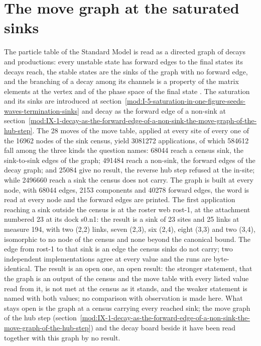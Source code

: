 \section{The move graph at the saturated sinks}\label{mod:I-5-D539442-w-gskm}
The particle table of the Standard Model is read as a directed graph of decays and productions: every unstable state has forward edges to the final states its decays reach, the stable states are the sinks of the graph with no forward edge, and the branching of a decay among its channels is a property of the matrix elements at the vertex and of the phase space of the final state \cite{Griffiths2008,Weinberg1995}. The saturation and its sinks are introduced at section~\ref{mod:I-5-saturation-in-one-figure-seeds-waves-termination-sinks} and decay as the forward edge of a non-sink at section~\ref{mod:IX-1-decay-as-the-forward-edge-of-a-non-sink-the-move-graph-of-the-hub-step}.
The 28 moves of the move table, applied at every site of every one of the 16962 nodes of the sink census, yield 3081272 applications, of which 584612 fall among the three kinds the question names: 68044 reach a census sink, the sink-to-sink edges of the graph; 491484 reach a non-sink, the forward edges of the decay graph; and 25084 give no result, the reverse hub step refused at the in-site; while 2496660 reach a sink the census does not carry.
The graph is built at every node, with 68044 edges, 2153 components and 40278 forward edges, the word is read at every node and the forward edges are printed. The first application reaching a sink outside the census is at the roster web rost-1, at the attachment numbered 23 at its dock s0.n1: the result is a sink of 23 sites and 25 links at measure 194, with two (2,2) links, seven (2,3), six (2,4), eight (3,3) and two (3,4), isomorphic to no node of the census and none beyond the canonical bound. The edge from rost-1 to that sink is an edge the census sinks do not carry; two independent implementations agree at every value and the runs are byte-identical.
The result is an open one, an open result: the stronger statement, that the graph is an output of the census and the move table with every listed value read from it, is not met at the census as it stands, and the weaker statement is named with both values; no comparison with observation is made here.
What stays open is the graph at a census carrying every reached sink; the move graph of the hub step (section~\ref{mod:IX-1-decay-as-the-forward-edge-of-a-non-sink-the-move-graph-of-the-hub-step}) and the decay board beside it have been read together with this graph by no result.

